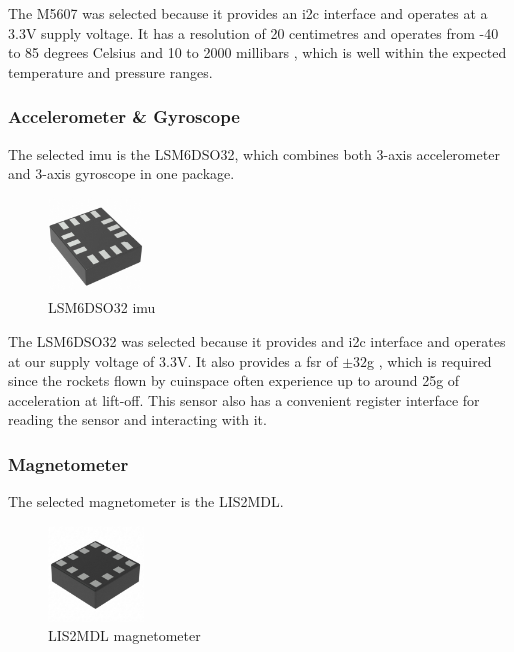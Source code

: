 The M5607 was selected because it provides an \gls{i2c} interface and operates at a 3.3V supply voltage. \cite[1]{ms5607-datasheet} It has a resolution of 20 centimetres \cite[1]{ms5607-datasheet} and operates from -40 to 85 degrees Celsius and 10 to 2000 millibars \cite[1]{ms5607-datasheet}, which is well within the expected temperature and pressure ranges.

\subsubsection{Accelerometer \& Gyroscope}

The selected \gls{imu} is the LSM6DSO32, which combines both 3-axis accelerometer and 3-axis gyroscope in one package.

\begin{figure}[H]
    \centering
    \includegraphics[width=1in]{assets/images/lsm6dso32.jpg}
    \caption{LSM6DSO32 \gls{imu} \cite{lsm6dso32-pic}}
\end{figure}

The LSM6DSO32 was selected because it provides and \gls{i2c} interface and operates at our supply voltage of 3.3V. \cite{lsm6dso32-datasheet} It also provides a \gls{fsr} of $\pm 32$g \cite[1]{lsm6dso32-datasheet}, which is required since the rockets flown by \gls{cuinspace} often experience up to around 25g of acceleration at lift-off. This sensor also has a convenient register interface for reading the sensor and interacting with it.

\subsubsection{Magnetometer}

The selected magnetometer is the LIS2MDL.

\begin{figure}[H]
    \centering
    \includegraphics[width=1in]{assets/images/lis2mdl.jpg}
    \caption{LIS2MDL magnetometer \cite{lis2dml-pic}}
    \label{fig:magnetometer}
\end{figure}

